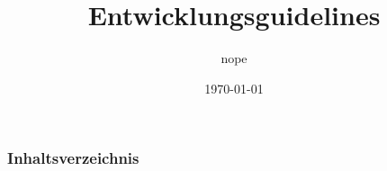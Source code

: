 \documentclass[hyperref={pdfpagelabels=false}]{beamer}
\title{Entwicklungsguidelines}
\author{nope}
\date{\today}
\begin{document}
\begin{frame}
\titlepage
\end{frame} 

\begin{frame}
\frametitle{Inhaltsverzeichnis}
\tableofcontents
\end{frame} 






\end{document}
